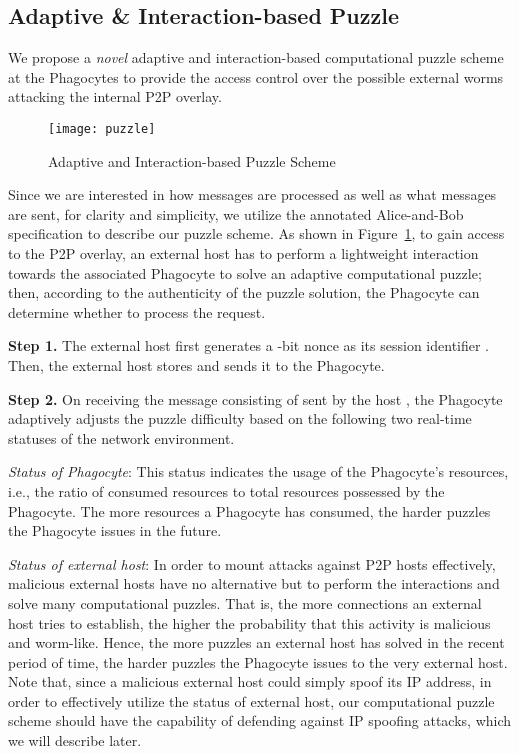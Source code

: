 \documentclass[times,10pt,twocolumn]{article}
\begin{document}
\subsection{Adaptive \& Interaction-based Puzzle}


We propose a \emph{novel} adaptive and interaction-based
computational puzzle scheme at the Phagocytes to provide the access
control over the possible external worms attacking the internal P2P
overlay.


\begin{figure}[tbp]
\centering
\texttt{[image: puzzle]}
\caption{Adaptive and Interaction-based Puzzle Scheme}
\label{fig:puzzle}
\end{figure}



Since we are interested in how messages are processed as well as
what messages are sent, for clarity and simplicity, we utilize the
annotated Alice-and-Bob specification to describe our puzzle scheme.
As shown in Figure~\ref{fig:puzzle}, to gain access to the P2P
overlay, an external host has to perform a lightweight interaction
towards the associated Phagocyte to solve an adaptive computational
puzzle; then, according to the authenticity of the puzzle solution,
the Phagocyte can determine whether to process the request.




\textbf{Step 1.} The external host  first generates a -bit
nonce  as its session identifier . Then, the external
host stores  and sends it to the Phagocyte.




\textbf{Step 2.} On receiving the message consisting of  sent
by the host , the Phagocyte  adaptively adjusts the puzzle
difficulty  based on the following two real-time statuses of the
network environment.



 \emph{Status of Phagocyte}: This status indicates the
usage of the Phagocyte's resources, i.e., the ratio of consumed
resources to total resources possessed by the Phagocyte. The more
resources a Phagocyte has consumed, the harder puzzles the Phagocyte
issues in the future.

 \emph{Status of external host}: In order to mount attacks
against P2P hosts effectively, malicious external hosts have no
alternative but to perform the interactions and solve many
computational puzzles. That is, the more connections an external
host tries to establish, the higher the probability that this
activity is malicious and worm-like. Hence, the more puzzles an
external host has solved in the recent period of time, the harder
puzzles the Phagocyte issues to the very external host. Note that,
since a malicious external host could simply spoof its IP address,
in order to effectively utilize the status of external host, our
computational puzzle scheme should have the capability of defending
against IP spoofing attacks, which we will describe later.
\end{document}
